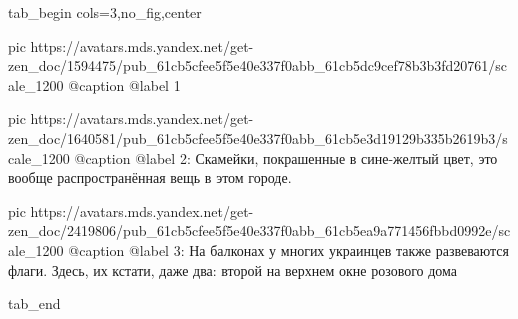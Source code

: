  
 
 
 
 


\ifcmt
  tab_begin cols=3,no_fig,center

     pic https://avatars.mds.yandex.net/get-zen_doc/1594475/pub_61cb5cfee5f5e40e337f0abb_61cb5dc9cef78b3b3fd20761/scale_1200
		 @caption @label 1

		 pic https://avatars.mds.yandex.net/get-zen_doc/1640581/pub_61cb5cfee5f5e40e337f0abb_61cb5e3d19129b335b2619b3/scale_1200
		 @caption @label 2: Скамейки, покрашенные в сине-желтый цвет, это вообще распространённая вещь в этом городе.

		 pic https://avatars.mds.yandex.net/get-zen_doc/2419806/pub_61cb5cfee5f5e40e337f0abb_61cb5ea9a771456fbbd0992e/scale_1200
		 @caption @label 3: На балконах у многих украинцев также развеваются флаги. Здесь, их кстати, даже два: второй на верхнем окне розового дома

  tab_end
\fi
